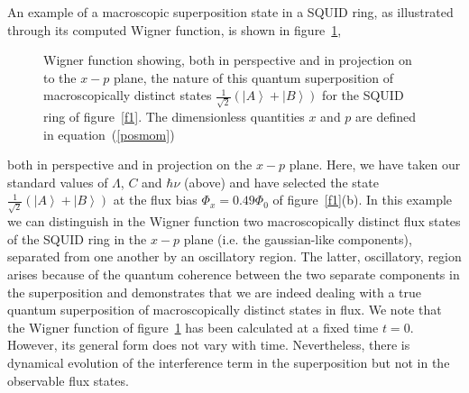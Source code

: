 \documentclass[twocolumn,a4paper,superscriptaddress,showpacs,floatfix,pra]{revtex4}
\begin{document}
An example  of a macroscopic superposition  state in a  SQUID ring, as
illustrated  through  its  computed   Wigner  function,  is  shown  in
figure~\ref{f3},
\begin{figure}[!t]
\begin{center}
\end{center}
\caption{Wigner   function  showing,  both   in  perspective   and  in
projection  on  to  the  $x-p$  plane,  the  nature  of  this  quantum
superposition       of      macroscopically       distinct      states
$\frac{1}{\sqrt{2}}\left(    \left\vert   A\right\rangle   +\left\vert
B\right\rangle \right)  $ for the  SQUID ring of  figure~\ref{f1}. The
dimensionless    quantities    $x$   and    $p$    are   defined    in
equation~(\ref{posmom}) }
\label{f3}
\end{figure}
both in  perspective and  in projection on  the $x-p$ plane.  Here, we
have taken  our standard values  of $\Lambda $,  $C$ and $\hbar  \nu $
(above)   and  have   selected  the   state  $\frac{1}{\sqrt{2}}\left(
\left\vert A\right\rangle +\left\vert  B\right\rangle \right) $ at the
flux  bias $\Phi  _{x}=0.49\Phi _{0}$  of figure~\ref{f1}(b).  In this
example we can distinguish  in the Wigner function two macroscopically
distinct flux  states of the SQUID  ring in the $x-p$  plane (i.e. the
gaussian-like   components),  separated   from  one   another   by  an
oscillatory region. The latter,  oscillatory, region arises because of
the  quantum coherence  between  the two  separate  components in  the
superposition and demonstrates that we  are indeed dealing with a true
quantum superposition  of macroscopically distinct states  in flux. We
note that  the Wigner function of figure~\ref{f3}  has been calculated
at a  fixed time $t=0$. However,  its general form does  not vary with
time.  Nevertheless, there is  dynamical evolution of the interference
term in the superposition but not in the observable flux states.
\end{document}
